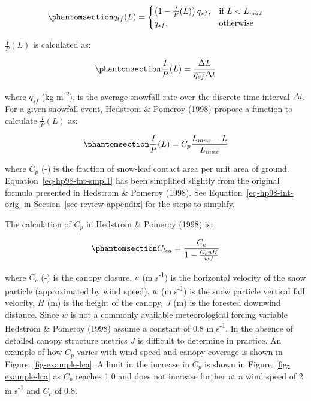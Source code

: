 \documentclass[
  letterpaper,
]{tex/uofsthesis-cs}
\begin{document}
\begin{equation}\phantomsection\label{eq-tf-ode}{
q_{tf}(L) = \begin{cases}
    \left(1-\frac{I}{P}(L)\right)q_{sf},& \text{if } L< L_{max}\\
    q_{sf},              & \text{otherwise}
\end{cases}
}\end{equation}

\(\frac{I}{P}(L)\) is calculated as:

\begin{equation}\phantomsection\label{eq-ip}{
\frac{I}{P}(L) = \frac{\Delta L}{\overline{q_{sf}} \Delta t} 
}\end{equation}

where \(\overline{q_{sf}}\) (kg m\textsuperscript{-2}), is the average
snowfall rate over the discrete time interval \(\Delta t\). For a given
snowfall event, Hedstrom \& Pomeroy (1998) propose a function to
calculate \(\frac{I}{P}(L)\) as:

\begin{equation}\phantomsection\label{eq-hp98-int-smpl1}{
\frac{I}{P}(L) = C_{p}\frac{L_{max}-L}{L_{max}}
}\end{equation}

where \(C_{p}\) (-) is the fraction of snow-leaf contact area per unit
area of ground. Equation~\ref{eq-hp98-int-smpl1} has been simplified
slightly from the original formula presented in Hedstrom \& Pomeroy
(1998). See Equation~\ref{eq-hp98-int-orig} in
Section~\ref{sec-review-appendix} for the steps to simplify.

The calculation of \(C_{p}\) in Hedstrom \& Pomeroy (1998) is:

\begin{equation}\phantomsection\label{eq-hp98-cp}{
C_{lca} = \frac{C_c}{1-\frac{C_cuH}{wJ}}
}\end{equation}

where \(C_c\) (-) is the canopy closure, \(u\) (m s\textsuperscript{-1})
is the horizontal velocity of the snow particle (approximated by wind
speed), \(w\) (m s\textsuperscript{-1}) is the snow particle vertical
fall velocity, \(H\) (m) is the height of the canopy, \(J\) (m) is the
forested downwind distance. Since \(w\) is not a commonly available
meteorological forcing variable Hedstrom \& Pomeroy (1998) assume a
constant of 0.8 m s\textsuperscript{-1}. In the absence of detailed
canopy structure metrics \(J\) is difficult to determine in practice. An
example of how \(C_p\) varies with wind speed and canopy coverage is
shown in Figure~\ref{fig-example-lca}. A limit in the increase in
\(C_p\) is shown in Figure~\ref{fig-example-lca} as \(C_p\) reaches 1.0
and does not increase further at a wind speed of 2 m
s\textsuperscript{-1} and \(C_c\) of 0.8.
\end{document}
